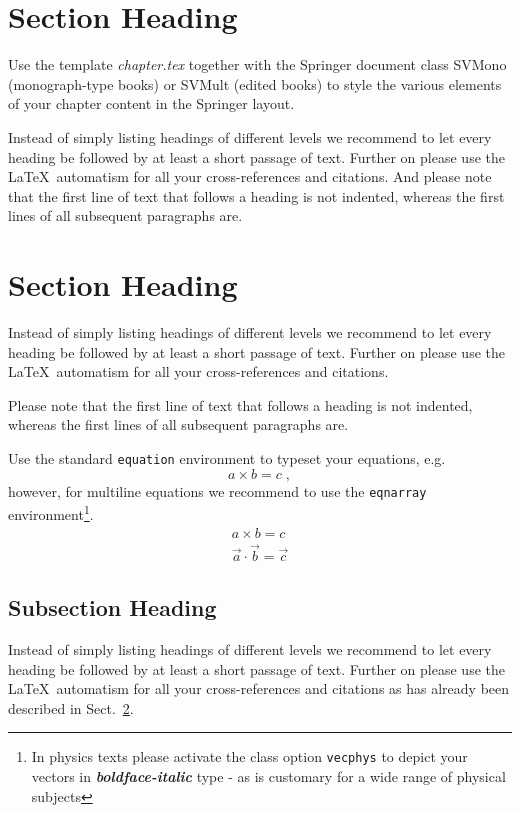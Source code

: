 \documentclass[graybox]{svmult}
\begin{document}
\section{Section Heading}
\label{g02:sec:1}
Use the template \emph{chapter.tex} together with the Springer document class SVMono (monograph-type books) or SVMult (edited books) to style the various elements of your chapter content in the Springer layout.

\cite{qca:mraz}


Instead of simply listing headings of different levels we recommend to let every heading be followed by at least a short passage of text. Further on please use the \LaTeX\ automatism for all your cross-references and citations. And please note that the first line of text that follows a heading is not indented, whereas the first lines of all subsequent paragraphs are.

\section{Section Heading}
\label{g02:sec:2}
Instead of simply listing headings of different levels we recommend to let every heading be followed by at least a short passage of text. Further on please use the \LaTeX\ automatism for all your cross-references and citations.

Please note that the first line of text that follows a heading is not indented, whereas the first lines of all subsequent paragraphs are.

Use the standard \verb|equation| environment to typeset your equations, e.g.
%
\begin{equation}
a \times b = c\;,
\end{equation}
%
however, for multiline equations we recommend to use the \verb|eqnarray|
environment\footnote{In physics texts please activate the class option
\texttt{vecphys} to depict your vectors in \textbf{\itshape
boldface-italic} type - as is customary for a wide range of physical
subjects}.
\begin{eqnarray}
a \times b = c \nonumber\\
\vec{a} \cdot \vec{b}=\vec{c}
\label{g02:eq:01}
\end{eqnarray}

\subsection{Subsection Heading}
\label{g02:subsec:2}
Instead of simply listing headings of different levels we recommend to let every heading be followed by at least a short passage of text. Further on please use the \LaTeX\ automatism for all your cross-references and citations as has already been described in Sect.~\ref{g02:sec:2}.
\end{document}
